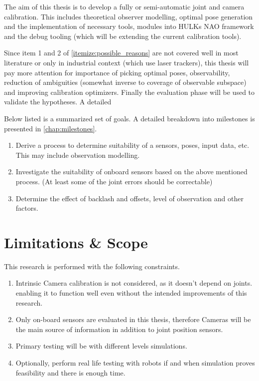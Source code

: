 \documentclass[english, printversion, nomenclature, notitle]{tuvisionthesis} %
\begin{document}
The aim of this thesis is to develop a fully or semi-automatic joint and camera calibration. This includes theoretical observer modelling, optimal  pose generation and the implementation of necessary tools, modules into HULKs NAO framework and the debug tooling (which will be extending the current calibration tools).

Since item 1 and 2 of \cref{itemize:possible_reasons} are not covered well in most literature or only in industrial context (which use laser trackers), this thesis will pay more attention for importance of picking optimal poses, observability, reduction of ambiguities (somewhat inverse to coverage of observable subspace)  and improving calibration optimizers. Finally the evaluation phase will be used to validate the hypotheses. A detailed 

Below listed is a summarized set of goals. A detailed breakdown into milestones is presented in \cref{chap:milestones}.

\begin{enumerate}
	\item Derive a process to determine suitability of a sensors, poses, input data, etc. This may include observation modelling.
	\item Investigate the suitability of onboard sensors based on the above mentioned process. (At least some of the joint errors should be correctable)
	\item Determine the effect of backlash and offsets, level of observation and other factors.
\end{enumerate}

\section{Limitations \& Scope}

This research is performed with the following constraints.

\begin{enumerate}
	\item Intrinsic Camera calibration is not considered, as it doesn't depend on joints. enabling it to function well even without the intended improvements of this research.
	\item Only on-board sensors are evaluated in this thesis, therefore Cameras will be the main source of information in addition to joint position sensors.
	\item Primary testing will be with different levels simulations.
	\item Optionally, perform real life testing with robots if and when simulation proves feasibility and there is enough time.
\end{enumerate}
\end{document}
